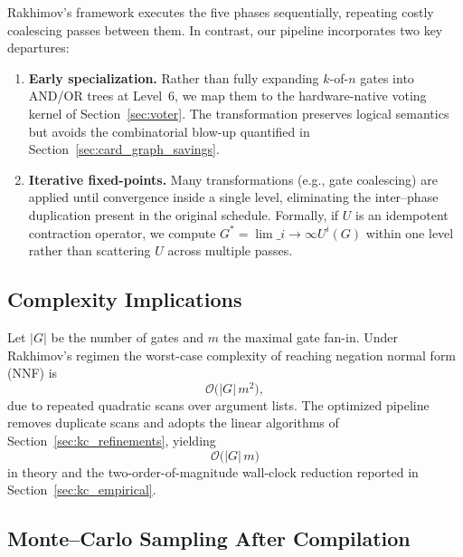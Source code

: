 Rakhimov’s framework executes the five phases sequentially, repeating
costly coalescing passes between them.  In contrast, our pipeline
incorporates two key departures:
\begin{enumerate}[label=(\arabic*)]
  \item \textbf{Early specialization.}  Rather than fully expanding
        $k$-of-$n$ gates into AND/OR trees at Level~6, we map them to
        the hardware-native voting kernel of
        Section~\ref{sec:voter}.  The transformation preserves logical
        semantics but avoids the combinatorial blow-up quantified in
        Section~\ref{sec:card_graph_savings}.
  \item \textbf{Iterative fixed-points.}  Many transformations (e.g.,
        gate coalescing) are applied until convergence inside a single
        level, eliminating the inter–phase duplication present in the
        original schedule.  Formally, if $U$ is an idempotent
        contraction operator, we compute
        $G^{\ast}=\lim\_{i\to\infty} U^{i}(G)$ within one level rather
        than scattering $U$ across multiple passes.
\end{enumerate}

\subsection{Complexity Implications}
\label{sec:kc_complexity_pipeline}

Let $|G|$ be the number of gates and $m$ the maximal gate fan-in.
Under Rakhimov’s regimen the worst-case complexity of reaching negation
normal form (NNF) is
\[
  \mathcal{O}\bigl(|G|\,m^{2}\bigr),
\]
due to repeated quadratic scans over argument lists.  The optimized
pipeline removes duplicate scans and adopts the linear algorithms of
Section~\ref{sec:kc_refinements}, yielding
\[
  \mathcal{O}\bigl(|G|\,m\bigr)
\]
in theory and the two-order-of-magnitude wall-clock reduction reported
in Section~\ref{sec:kc_empirical}.

\subsection{Monte–Carlo Sampling After Compilation}
\label{sec:kc_sampling}

